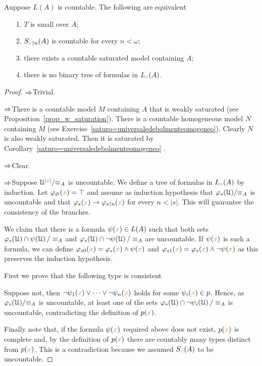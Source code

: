 \documentclass[creche.tex]{subfiles}
\begin{document}
\begin{proposition}\label{prop_small_equivalents}
Auppose $L(A)$ is countable. The following are equivalent\nobreak
\begin{itemize}   
\item[1.] $T$ is small over $A$;
\item[2.] $S_{{\color{brown} x}\restriction n}(A)$ is countable for every $n<\omega$;
\item[3.] there exists a countable saturated model containing $A$;
\item[4.] there is no binary tree of formulas in $L_{\color{brown} x}(A)$.
\end{itemize}
\end{proposition}
\begin{proof} $\Rightarrow$\quad Trivial.


$\Rightarrow$\quad There is a countable model $M$ containing $A$ that is weakly saturated (see Proposition~\ref{prop_w_saturation}). There is a countable homogeneous model $N$ containing $M$ (see Exercise~\ref{saturo=universaledebolmenteomogeneo}). Clearly $N$ is also weakly saturated. Then it is saturated by Corollary~\ref{saturo=universaledebolmenteomogeneo} .


$\Rightarrow$\quad Clear.

$\Rightarrow$\quad Suppose $\EuScript U^{|{\color{brown} x}|}/\mathord\equiv_A$ is uncountable. We define a tree of formulas in $L_{\color{brown} x}(A)$ by induction. Let $\varphi_\varnothing({\color{brown} x})=\top$ and assume as induction hypothesis that $\varphi_s(\EuScript U)/\mathord\equiv_A$ is uncountable and that $\varphi_s({\color{brown} x})\rightarrow\varphi_{s\restriction n}({\color{brown} x})$ for every $n<|s|$. This will guarantee the consistency of the branches.


We claim that there is a formula $\psi({\color{brown} x})\in L(A)$ such that both sets $\varphi_s(\EuScript U)\cap\psi(\EuScript U)\,/\equiv_A$ and $\varphi_s(\EuScript U)\cap\neg\psi(\EuScript U)\,/\equiv_A$ are uncountable. If $\psi({\color{brown} x})$ is such a formula, we can define $\varphi_{s0}({\color{brown} x})=\varphi_s({\color{brown} x})\wedge\psi({\color{brown} x})$ and $\varphi_{s1}({\color{brown} x})=\varphi_s({\color{brown} x})\wedge\neg\psi({\color{brown} x})$ as this preserves the induction hypothesis.


First we prove that the following type is consistent


Suppose not, then $\neg\psi_1({\color{brown} x})\vee\dots\vee\neg\psi_n({\color{brown} x})$ holds for some $\psi_i({\color{brown} x})\in p$. Hence, as $\varphi_s(\EuScript U)/\mathord\equiv_A$ is uncountable, at least one of the sets $\varphi_s(\EuScript U)\cap\neg\psi_i(\EuScript U)\,/\equiv_A$ is uncountable, contradicting the definition of $p({\color{brown} x})$.

Finally note that, if the formula $\psi({\color{brown} x})$ required above does not exist, $p({\color{brown} x})$ is complete and, by the definition of $p({\color{brown} x})$ there are countably many types distinct from $p({\color{brown} x})$. This is a contradiction because we assumed $S_{\color{brown} x}(A)$ to be uncountable.
\end{proof}
\end{document}
